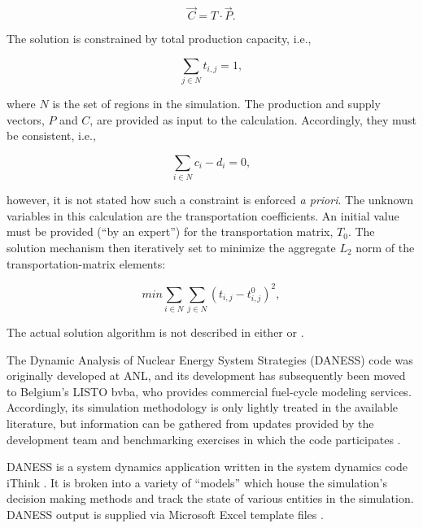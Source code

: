 \begin{equation*}
\vec{C} = T \cdot \vec{P}.
\end{equation*}

The solution is constrained by total production capacity, i.e., 

\begin{equation*}
\sum_{j \in N} t_{i,j} = 1,
\end{equation*}

where $N$ is the set of regions in the simulation. The production and supply
vectors, $P$ and $C$, are provided as input to the calculation. Accordingly,
they must be consistent, i.e.,

\begin{equation*}
\sum_{i \in N} c_i - d_i = 0,
\end{equation*}

however, it is not stated how such a constraint is enforced \textit{a
  priori}. The unknown variables in this calculation are the transportation
coefficients. An initial value must be provided (``by an expert'') for the
transportation matrix, $T_0$. The solution mechanism then iteratively set to
minimize the aggregate $L_2$ norm of the transportation-matrix elements:

\begin{equation*}
min \sum_{i \in N} \sum_{j \in N} \left( t_{i,j} - t_{i,j}^0 \right)^2,
\end{equation*}

The actual solution algorithm is not described in either
\cite{iaea_nuclear_2010} or \cite{andrianova_desae_2008}.

The Dynamic Analysis of Nuclear Energy System Strategies (DANESS) code was
originally developed at ANL, and its development has subsequently been moved to
Belgium's LISTO bvba, who provides commercial fuel-cycle modeling
services. Accordingly, its simulation methodology is only lightly treated in the
available literature, but information can be gathered from updates provided by
the development team \cite{van_den_durpel_daness_2009} and benchmarking
exercises in which the code participates \cite{guerin_benchmark_2009}. 

DANESS is a system dynamics application written in the system dynamics code
iThink \cite{richmond_ithink_2004}. It is broken into a variety of ``models''
which house the simulation's decision making methods and track the state of
various entities in the simulation. DANESS output is supplied via Microsoft
Excel template files \cite{guerin_benchmark_2009}.

